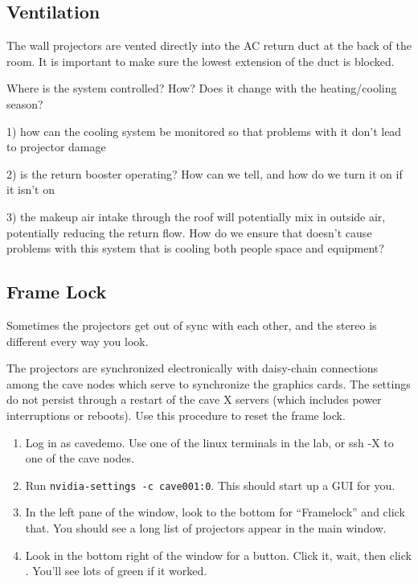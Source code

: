 \documentclass[11pt]{article}
\newcommand{\cmd}[1]{\texttt{#1}\xspace}
\newcommand{\menu}[1]{``#1''\xspace}
\newcommand{\button}[1]{\framebox{\textsf{#1}\xspace}}
\begin{document}
\subsection{Ventilation}

The wall projectors are vented directly into the AC return duct at the
back of the room.  It is important to make sure the lowest extension
of the duct is blocked.

Where is the system controlled?  How?  Does it change with the
heating/cooling season?

1) how can the cooling system be monitored so that problems with it
don’t lead to projector damage

2) is the return booster operating?  How can we tell, and how do we
turn it on if it isn’t on

3) the makeup air intake through the roof will potentially mix in
outside air, potentially reducing the return flow.  How do we ensure
that doesn’t cause problems with this system that is cooling both
people space and equipment?


\subsection{Frame Lock}
\label{framelock}

Sometimes the projectors get out of sync with each other, and the
stereo is different every way you look.

The projectors are synchronized electronically with daisy-chain
connections among the cave nodes which serve to synchronize the
graphics cards.  The settings do not persist through a restart of the
cave X servers (which includes power interruptions or reboots).  Use
this procedure to reset the frame lock.

\begin{enumerate}

\item Log in as cavedemo.  Use one of the linux terminals in the lab,
  or ssh -X to one of the cave nodes.

\item Run \cmd{nvidia-settings -c cave001:0}.  This should start up
  a GUI for you.

\item In the left pane of the window, look to the bottom for
  \menu{Framelock} and click that.  You should see a long list of
  projectors appear in the main window.

\item Look in the bottom right of the window for a \button{Disable frame
  lock} button.  Click it, wait, then click \button{Enable frame lock}.
  You'll see lots of green if it worked.

\end{enumerate}
\end{document}
